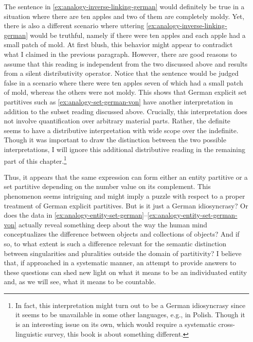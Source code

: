 The sentence in \ref{ex:analogy-inverse-linking-german} would definitely be true in a situation where there are ten apples and two of them are completely moldy. Yet, there is also a different scenario where uttering \ref{ex:analogy-inverse-linking-german} would be truthful, namely if there were ten apples and each apple had a small patch of mold. At first blush, this behavior might appear to contradict what I claimed in the previous paragraph. However, there are good reasons to assume that this reading is independent from the two discussed above and results from a silent distributivity operator. Notice that the sentence would be judged false in a scenario where there were ten apples seven of which had a small patch of mold, whereas the others were not moldy. This shows that German explicit set partitives such as \ref{ex:analogy-set-german-von} have another interpretation in addition to the subset reading discussed above. Crucially, this interpretation does not involve quantification over arbitrary material parts. Rather, the definite seems to have a distributive interpretation with wide scope over the indefinite. Though it was important to draw the distinction between the two possible interpretations, I will ignore this additional distributive reading in the remaining part of this chapter.\footnote{In fact, this interpretation might turn out to be a German idiosyncrasy since it seems to be unavailable in some other languages, e.g., in Polish. Though it is an interesting issue on its own, which would require a systematic cross-linguistic survey, this book is about something different.}

Thus, it appears that the same expression can form either an entity partitive or a set partitive depending on the number value on its complement. This phenomenon seems intriguing and might imply a puzzle with respect to a proper treatment of German explicit partitives. But is it just a German idiosyncrasy? Or does the data in \ref{ex:analogy-entity-set-german}--\ref{ex:analogy-entity-set-german-von} actually reveal something deep about the way the human mind conceptualizes the difference between objects and collections of objects? And if so, to what extent is such a difference relevant for the semantic distinction between singularities and pluralities outside the domain of partitivity? I believe that, if approached in a systematic manner, an attempt to provide answers to these questions can shed new light on what it means to be an individuated entity and, as we will see, what it means to be countable.

